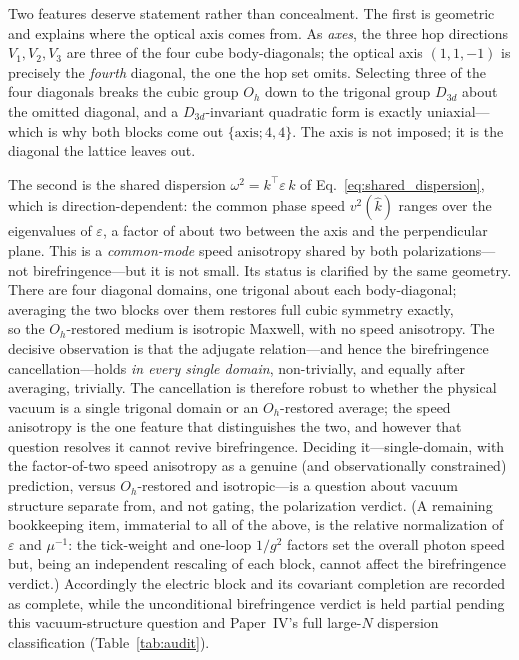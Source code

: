 Two features deserve statement rather than concealment. The first is geometric and
explains where the optical axis comes from. As \emph{axes}, the three hop directions
$V_1,V_2,V_3$ are three of the four cube body-diagonals; the optical axis
$(1,1,-1)$ is precisely the \emph{fourth} diagonal, the one the hop set omits.
Selecting three of the four diagonals breaks the cubic group $O_h$ down to the
trigonal group $D_{3d}$ about the omitted diagonal, and a $D_{3d}$-invariant
quadratic form is exactly uniaxial---which is why both blocks come out
$\{\text{axis};4,4\}$. The axis is not imposed; it is the diagonal the lattice leaves
out.

The second is the shared dispersion $\omega^2=k^{\!\top}\varepsilon\,k$ of
Eq.~\eqref{eq:shared_dispersion}, which is direction-dependent: the common phase
speed $v^2(\hat k)$ ranges over the eigenvalues of $\varepsilon$, a factor of about
two between the axis and the perpendicular plane. This is a \emph{common-mode} speed
anisotropy shared by both polarizations---not birefringence---but it is not small.
Its status is clarified by the same geometry. There are four diagonal domains, one
trigonal about each body-diagonal; averaging the two blocks over them restores full
cubic symmetry exactly,
%
\begin{equation}
    \label{eq:oh_average}
    
\end{equation}
%
so the $O_h$-restored medium is isotropic Maxwell, with no speed anisotropy. The
decisive observation is that the adjugate relation---and hence the birefringence
cancellation---holds \emph{in every single domain}, non-trivially, and equally after
averaging, trivially. The cancellation is therefore robust to whether the physical
vacuum is a single trigonal domain or an $O_h$-restored average; the speed anisotropy
is the one feature that distinguishes the two, and however that question resolves it
cannot revive birefringence. Deciding it---single-domain, with the factor-of-two
speed anisotropy as a genuine (and observationally constrained) prediction, versus
$O_h$-restored and isotropic---is a question about vacuum structure separate from,
and not gating, the polarization verdict. (A remaining bookkeeping item, immaterial
to all of the above, is the relative normalization of $\varepsilon$ and $\mu^{-1}$:
the tick-weight and one-loop $1/g^2$ factors set the overall photon speed but, being
an independent rescaling of each block, cannot affect the birefringence verdict.)
Accordingly the electric block and its covariant completion are recorded as complete,
while the unconditional birefringence verdict is held partial pending this
vacuum-structure question and Paper~IV's full large-$N$ dispersion classification
(Table~\ref{tab:audit}).
